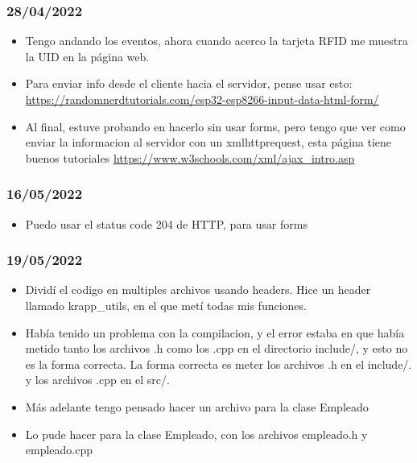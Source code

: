 \documentclass[../informe_krapp.tex]{subfiles}
\begin{document}
\subsubsection{28/04/2022}
\begin{itemize}
	\item Tengo andando los eventos, ahora cuando acerco la tarjeta RFID me muestra
	      la UID en la página web.
	\item Para enviar info desde el cliente hacia el servidor, pense usar esto:
	      \url{https://randomnerdtutorials.com/esp32-esp8266-input-data-html-form/}
	\item Al final, estuve probando en hacerlo sin usar forms, pero
	      tengo que ver como enviar la informacion al servidor con un
	      xmlhttprequest, esta página tiene buenos tutoriales
	      \url{https://www.w3schools.com/xml/ajax_intro.asp}
\end{itemize}

\subsubsection{16/05/2022}
\begin{itemize}
	\item Puedo usar el status code 204 de HTTP, para usar forms
\end{itemize}

\subsubsection{19/05/2022}
\begin{itemize}
	\item Dividí el codigo en multiples archivos usando headers.
	      Hice un header llamado krapp\_utils, en el que metí todas mis funciones.
	\item Había tenido un problema con la compilacion, y el error estaba en que había metido
	      tanto los archivos .h como los .cpp en el directorio include/, y esto no es
	      la forma correcta. La forma correcta es meter los archivos .h en el include/. y
	      los archivos .cpp en el src/.
	\item Más adelante tengo pensado hacer un archivo para la clase Empleado
	\item Lo pude hacer para la clase Empleado, con los archivos empleado.h y empleado.cpp
\end{itemize}
\end{document}
